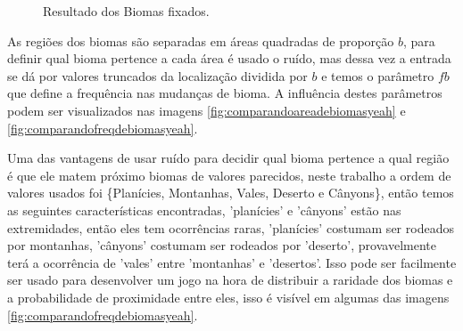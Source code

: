 \begin{figure}[H]
     \caption{Resultado dos Biomas fixados.}
     
     \label{fig:bssComBiomasFixados}
\end{figure}

As regiões dos biomas são separadas em áreas quadradas de proporção $b$, para definir
qual bioma pertence a cada área é usado o ruído, mas dessa vez a entrada se dá por valores
truncados da localização dividida por $b$ e temos o parâmetro $fb$ que define a frequência nas
mudanças de bioma. A influência destes parâmetros podem ser visualizados nas imagens \ref{fig:comparandoareadebiomasyeah} e \ref{fig:comparandofreqdebiomasyeah}.

Uma das vantagens de usar ruído para decidir qual bioma pertence a qual 
região é que ele matem próximo biomas de valores parecidos, neste trabalho a ordem de 
valores usados foi \{Planícies, Montanhas, Vales, Deserto e Cânyons\}, então temos as seguintes
características encontradas, 'planícies' e 'cânyons' estão nas extremidades, então eles 
tem ocorrências raras, 'planícies' costumam ser rodeados por montanhas, 'cânyons' costumam
ser rodeados por 'deserto', provavelmente terá a ocorrência de 'vales' entre 'montanhas' e 'desertos'.
Isso pode ser facilmente ser usado para desenvolver um jogo na hora de distribuir 
a raridade dos biomas e a probabilidade de proximidade entre eles, isso é visível em algumas das imagens \ref{fig:comparandofreqdebiomasyeah}.

